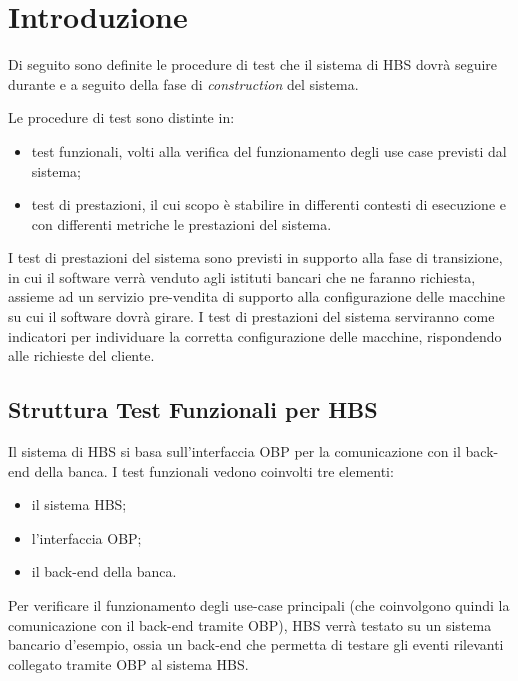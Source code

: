 
\section{Introduzione}

Di seguito sono definite le procedure di test che il sistema di HBS dovr\`a seguire durante e a seguito della fase di \emph{construction} del sistema.

Le procedure di test sono distinte in:
\begin{itemize}
	\item test funzionali, volti alla verifica del funzionamento degli use case previsti dal sistema;
	\item test di prestazioni, il cui scopo \`e stabilire in differenti contesti di esecuzione e con differenti metriche le prestazioni del sistema.
\end{itemize}

I test di prestazioni del sistema sono previsti in supporto alla fase di transizione, in cui il software verr\`a venduto agli istituti bancari che ne faranno richiesta, assieme ad un servizio pre-vendita di supporto alla configurazione delle macchine su cui il software dovr\`a girare.
I test di prestazioni del sistema serviranno come indicatori per individuare la corretta configurazione delle macchine, rispondendo alle richieste del cliente.

\subsection{Struttura Test Funzionali per HBS}

Il sistema di HBS si basa sull'interfaccia OBP per la comunicazione con il back-end della banca.
I test funzionali vedono coinvolti tre elementi:
\begin{itemize}
	\item il sistema HBS;
	\item l'interfaccia OBP;
	\item il back-end della banca.
\end{itemize}
Per verificare il funzionamento degli use-case principali (che coinvolgono quindi la comunicazione con il back-end tramite OBP), HBS verr\`a testato su un sistema bancario d'esempio, ossia un back-end che permetta di testare gli eventi rilevanti collegato tramite OBP al sistema HBS.

